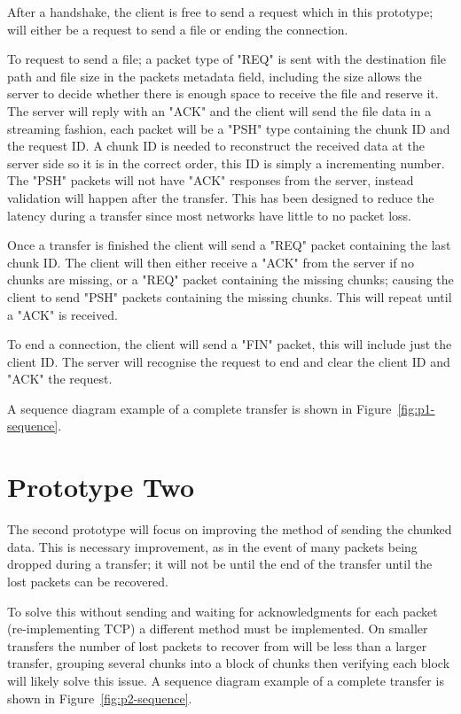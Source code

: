 After a handshake, the client is free to send a request which in this prototype; will either be a request to send a file or ending the connection.

To request to send a file; a packet type of "REQ" is sent with the destination file path and file size in the packets metadata field, including the size allows the server to decide whether there is enough space to receive the file and reserve it. The server will reply with an "ACK" and the client will send the file data in a streaming fashion, each packet will be a "PSH" type containing the chunk ID and the request ID. A chunk ID is needed to reconstruct the received data at the server side so it is in the correct order, this ID is simply a incrementing number. The "PSH" packets will not have "ACK" responses from the server, instead validation will happen after the transfer. This has been designed to reduce the latency during a transfer since most networks have little to no packet loss.

Once a transfer is finished the client will send a "REQ" packet containing the last chunk ID. The client will then either receive a "ACK" from the server if no chunks are missing, or a "REQ" packet containing the missing chunks; causing the client to send "PSH" packets containing the missing chunks. This will repeat until a "ACK" is received.

To end a connection, the client will send a "FIN" packet, this will include just the client ID. The server will recognise the request to end and clear the client ID and "ACK" the request.

A sequence diagram example of a complete transfer is shown in Figure~\ref{fig:p1-sequence}.

\section{Prototype Two}
The second prototype will focus on improving the method of sending the chunked data. This is necessary improvement, as in the event of many packets being dropped during a transfer; it will not be until the end of the transfer until the lost packets can be recovered.

To solve this without sending and waiting for acknowledgments for each packet (re-implementing TCP) a different method must be implemented. On smaller transfers the number of lost packets to recover from will be less than a larger transfer, grouping several chunks into a block of chunks then verifying each block will likely solve this issue. A sequence diagram example of a complete transfer is shown in Figure~\ref{fig:p2-sequence}.

